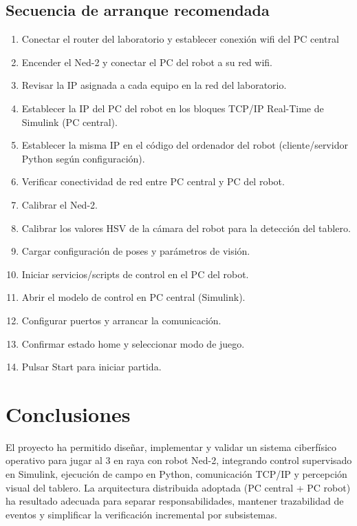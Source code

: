 \documentclass[12pt,a4paper]{article}
\begin{document}
\subsection{Secuencia de arranque recomendada}
\begin{enumerate}
  \item Conectar el router del laboratorio y establecer conexión wifi del PC central
  \item Encender el Ned-2 y conectar el PC del robot a su red wifi.
  \item Revisar la IP asignada a cada equipo en la red del laboratorio.
  \item Establecer la IP del PC del robot en los bloques TCP/IP Real-Time de Simulink (PC central).
  \item Establecer la misma IP en el código del ordenador del robot (cliente/servidor Python según configuración).
  \item Verificar conectividad de red entre PC central y PC del robot.
  \item Calibrar el Ned-2.
  \item Calibrar los valores HSV de la cámara del robot para la detección del tablero.
  \item Cargar configuración de poses y parámetros de visión.
  \item Iniciar servicios/scripts de control en el PC del robot.
  \item Abrir el modelo de control en PC central (Simulink).
  \item Configurar puertos y arrancar la comunicación.
  \item Confirmar estado home y seleccionar modo de juego.
  \item Pulsar Start para iniciar partida.
\end{enumerate}

\section{Conclusiones}

El proyecto ha permitido diseñar, implementar y validar un sistema ciberfísico operativo para jugar al 3 en raya con robot Ned-2, integrando control supervisado en Simulink, ejecución de campo en Python, comunicación TCP/IP y percepción visual del tablero. La arquitectura distribuida adoptada (PC central + PC robot) ha resultado adecuada para separar responsabilidades, mantener trazabilidad de eventos y simplificar la verificación incremental por subsistemas.
\end{document}
